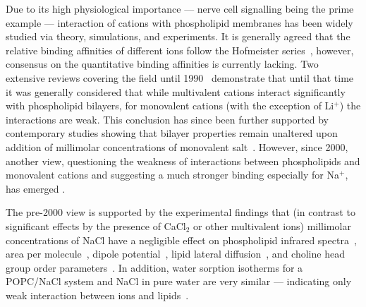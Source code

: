 \documentclass[pre,aps,floatfix,authordate1-4,twocolumn]{revtex4-1}
\begin{document}
Due to its high physiological importance --- nerve cell signalling being the prime example ---
interaction of cations with phospholipid membranes
has been widely studied via theory, simulations, and experiments.
It is generally agreed that the relative binding affinities of different ions 
follow the Hofmeister series~\cite{eisenberg79,cevc90,tocanne90,binder02,celma07,leontidis09,vacha09a,klasczyk10,harb13}, 
however,
consensus on the quantitative binding affinities is currently lacking.
Two extensive reviews covering the field until 1990~\cite{cevc90,tocanne90}
demonstrate that until that time it was generally considered that
while  multivalent cations interact significantly with phospholipid bilayers,
for monovalent cations (with the exception of Li$^+$) the interactions are weak.
This conclusion has since been further supported by contemporary
studies showing that bilayer properties remain unaltered upon addition of millimolar concentrations of monovalent 
salt~\cite{binder02,pabst07,filippov09}. 
However, since 2000, another view, questioning the weakness of interactions between phospholipids and monovalent cations
and suggesting a much stronger binding especially for Na$^{+}$, has emerged
\cite{bockmann03,bockmann04,vacha09a,manyes05,manyes06,fukuma07,leontidis09,ferber11,morata12,klasczyk10,harb13}.

The pre-2000 view is supported by the experimental findings that
(in contrast to significant effects by the presence of CaCl$_2$ or other multivalent ions)
millimolar concentrations of NaCl have a negligible effect on
phospholipid infrared spectra~\cite{binder02},
area per molecule~\cite{pabst07},
dipole potential~\cite{clarke99},
lipid lateral diffusion~\cite{filippov09},
and choline head group order parameters~\cite{akutsu81}.
In addition, water sorption isotherms for a POPC/NaCl system and NaCl in pure water are very similar
--- indicating only weak interaction between ions and lipids~\cite{binder02}. %
\end{document}
